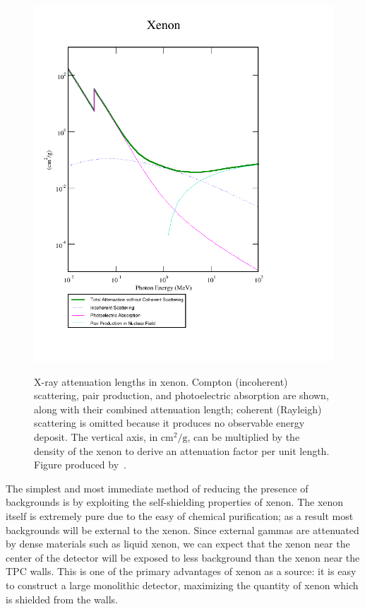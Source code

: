 \begin{figure}
\begin{center}
\includegraphics[keepaspectratio=true,width=\textwidth]{XrayAttenuationXenon.png}
\end{center}
\renewcommand{\baselinestretch}{1}
\small\normalsize
\begin{quote}
\caption{X-ray attenuation lengths in xenon.  Compton (incoherent) scattering, pair production, and photoelectric absorption are shown, along with their combined attenuation length; coherent (Rayleigh) scattering is omitted because it produces no observable energy deposit.  The vertical axis, in $\text{cm}^2/\text{g}$, can be multiplied by the density of the xenon to derive an attenuation factor per unit length.  Figure produced by~\cite{XcomXenonAttenuation}.}
\label{fig:XrayAttenuationXenon}
\end{quote}
\end{figure}
\renewcommand{\baselinestretch}{2}
\small\normalsize

The simplest and most immediate method of reducing the presence of backgrounds is by exploiting the self-shielding properties of xenon.  The xenon itself is extremely pure due to the easy of chemical purification; as a result most backgrounds will be external to the xenon.  Since external gammas are attenuated by dense materials such as liquid xenon, we can expect that the xenon near the center of the detector will be exposed to less background than the xenon near the TPC walls.  This is one of the primary advantages of xenon as a source: it is easy to construct a large monolithic detector, maximizing the quantity of xenon which is shielded from the walls.

